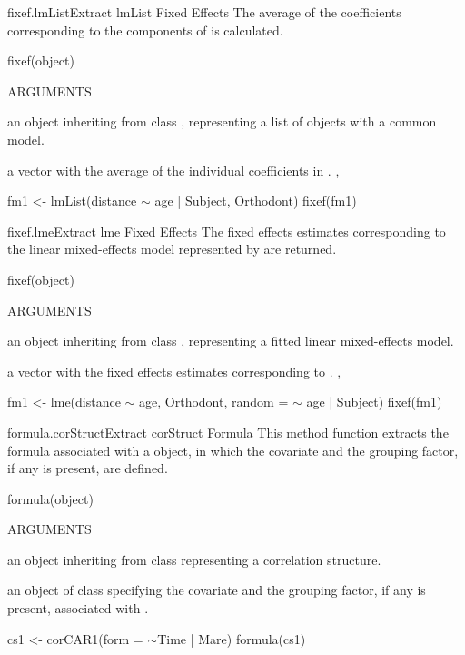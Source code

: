\documentclass[pdftex]{article} \usepackage{url,graphicx}
\renewcommand{\Twiddle}{\mbox{\(\sim\)}}
\begin{document}
\begin{Helpfile}{fixef.lmList}{Extract lmList Fixed Effects}
The average of the coefficients corresponding to the 
components of  is calculated.
\begin{Example}
fixef(object)
\end{Example}
\begin{Argument}{ARGUMENTS}
\item[\Co{object:}]
an object inheriting from class , representing
a list of  objects with a common model.
\end{Argument}
a vector with the average of the individual  coefficients in
.
, 
\need 15pt
\vspace{-16pt}
\begin{Example}
fm1 <- lmList(distance {\Twiddle} age | Subject, Orthodont)
fixef(fm1)
\end{Example}
\end{Helpfile}
\begin{Helpfile}{fixef.lme}{Extract lme Fixed Effects}
The fixed effects estimates corresponding to the linear mixed-effects
model represented by  are returned.
\begin{Example}
fixef(object)
\end{Example}
\begin{Argument}{ARGUMENTS}
\item[\Co{object:}]
an object inheriting from class , representing
a fitted linear mixed-effects model.
\end{Argument}
a vector with the fixed effects estimates corresponding to
.
, 
\need 15pt
\vspace{-16pt}
\begin{Example}
fm1 <- lme(distance {\Twiddle} age, Orthodont, random = {\Twiddle} age | Subject)
fixef(fm1)
\end{Example}
\end{Helpfile}
\begin{Helpfile}{formula.corStruct}{Extract corStruct Formula}
This method function extracts the formula associated with a
 object, in which the covariate and the grouping
factor, if any is present, are defined.
\begin{Example}
formula(object)
\end{Example}
\begin{Argument}{ARGUMENTS}
\item[\Co{object:}]
an object inheriting from class 
representing a correlation structure.
\end{Argument}
an object of class  specifying the covariate and the
grouping factor, if any is present, associated with .
\need 15pt
\vspace{-16pt} 
\begin{Example}
cs1 <- corCAR1(form = \Twiddle Time | Mare)
formula(cs1)
\end{Example}
\end{Helpfile}
\end{document}

